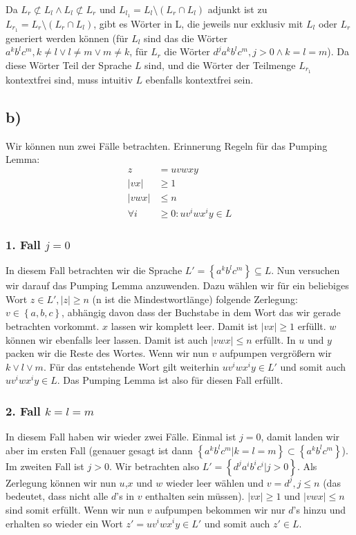 \documentclass{article}
\begin{document}
Da $L_r \not\subset L_l \wedge L_l \not\subset L_r$ und $L_{l_1} = L_l \setminus \left( L_r \cap L_l \right)$ adjunkt ist zu $L_{r_1} = L_r \setminus \left( L_r \cap L_l \right)$, gibt es Wörter in L, die jeweils nur exklusiv mit $L_l$ oder $L_r$ generiert werden können (für $L_l$ sind das die Wörter $a^kb^lc^m, k\neq l \vee l \neq m \vee m \neq k$, für $L_r$ die Wörter $d^ja^kb^lc^m, j>0 \wedge k=l=m$). Da diese Wörter Teil der Sprache $L$ sind, und die Wörter der Teilmenge $L_{r_1}$ kontextfrei sind, muss intuitiv $L$ ebenfalls kontextfrei sein.


\subsection*{b)}
Wir können nun zwei Fälle betrachten. Erinnerung Regeln für das Pumping Lemma:
\begin{align*}
z &= uvwxy \\
|vx| &\geq 1\\
|vwx| &\leq n \\
\forall i &\geq 0: uv^iwx^iy\in L 
\end{align*}

\subsubsection*{1. Fall $j=0$}
In diesem Fall betrachten wir die Sprache $L'=\left\{a^kb^lc^m\right\} \subseteq L$. Nun versuchen wir darauf das Pumping Lemma anzuwenden. Dazu wählen wir für ein beliebiges Wort $z\in L',|z|\geq n$ (n ist die Mindestwortlänge) folgende Zerlegung: $v\in \left\{a,b,c\right\}$, abhängig davon dass der Buchstabe in dem Wort das wir gerade betrachten vorkommt. $x$ lassen wir komplett leer. Damit ist $|vx| \geq 1$ erfüllt. $w$ können wir ebenfalls leer lassen. Damit ist auch $|vwx| \leq n$ erfüllt. In $u$ und $y$ packen wir die Reste des Wortes. Wenn wir nun $v$ aufpumpen vergrößern wir $k \vee l \vee m$. Für das entstehende Wort gilt weiterhin $uv^iwx^iy \in L'$ und somit auch $uv^iwx^iy \in L$. Das Pumping Lemma ist also für diesen Fall erfüllt.

\subsubsection*{2. Fall $k=l=m$}
In diesem Fall haben wir wieder zwei Fälle. Einmal ist $j=0$, damit landen wir aber im ersten Fall (genauer gesagt ist dann $\left\{a^kb^lc^m|k=l=m\right\} \subset \left\{a^kb^lc^m\right\}$). Im zweiten Fall ist $j>0$. Wir betrachten also $L'=\left\{d^ja^ib^ic^i|j>0\right\}$. Als Zerlegung können wir nun $u$,$x$ und $w$ wieder leer wählen und $v=d^j, j\leq n$ (das bedeutet, dass nicht alle $d$'s in $v$ enthalten sein müssen). $|vx| \geq 1$ und $|vwx| \leq n$ sind somit erfüllt. Wenn wir nun $v$ aufpumpen bekommen wir nur $d$'s hinzu und erhalten so wieder ein Wort $z' = uv^iwx^iy \in L'$ und somit auch $z' \in L$.
\end{document}
